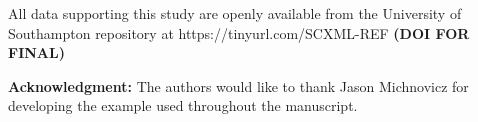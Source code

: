 \documentclass[runningheads,a4paper]{llncs}
\begin{document}
\begin{scriptsize}
	\vspace{6 pt}
	\noindent
	All data supporting this study are openly available from the University of Southampton repository at
	https://tinyurl.com/SCXML-REF    \textbf{(DOI FOR FINAL)}

\end{scriptsize}
\begin{footnotesize}
\vspace{6 pt}
\noindent
\textbf{Acknowledgment:} The authors would like to thank Jason Michnovicz for developing the \IDS example used throughout the manuscript.

\par

\end{footnotesize}



\end{document}
